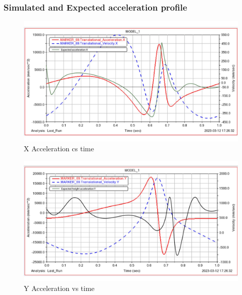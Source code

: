         \subsubsection{Simulated and Expected acceleration profile}
            \begin{figure}[hbt!]
                \centering
                \includegraphics[width=0.9\columnwidth]{Images/x_acc madhav-01.jpg}
                \caption{X Acceleration cs time}
                \label{fig:x_acc}
            \end{figure}

            \begin{figure}[hbt!]
                \centering
                \includegraphics[width=0.9\columnwidth]{Images/height_acceleration madhav-01.jpg}
                \caption{Y Acceleration vs time}
                \label{fig:y_acc}
            \end{figure}

